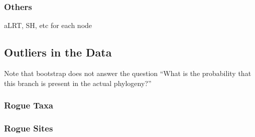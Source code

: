 \subsubsection{Others} \label{sec:other-confidence}

aLRT, SH, etc for each node

\subsection{Outliers in the Data} \label{sec:outliers}

Note that bootstrap does not answer the question ``What is the probability that this branch is present in the actual phylogeny?''

\subsubsection{Rogue Taxa} \label{sec:rogue-taxa}

\subsubsection{Rogue Sites} \label{sec:rogue-sites}
